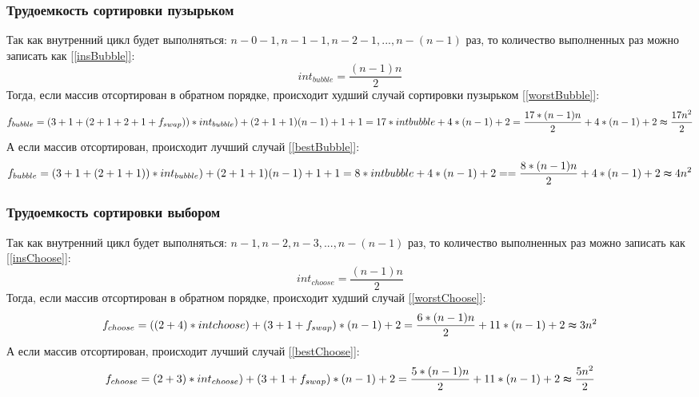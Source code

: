 \documentclass{article}
\begin{document}
		\subsubsection{Трудоемкость сортировки пузырьком}
		Так как внутренний цикл будет выполняться: $n-0-1,n-1-1,n-2-1,...,n-(n-1)$ раз, то количество выполненных раз можно записать как \hyperref[insBubble]{[\ref{insBubble}]}:
\begin{equation}\label{insBubble}
	int_{bubble}=\frac{(n-1)n}{2}
\end{equation}
	Тогда, если массив отсортирован в обратном порядке, происходит худший случай сортировки пузырьком \hyperref[worstBubble]{[\ref{worstBubble}]}:
	\begin{equation}\label{worstBubble}
		f_{bubble} = (3 + 1 + (2 + 1 + 2 + 1 + f_{swap})) * int_{bubble}) + (2 + 1 + 1)(n - 1) + 1 + 1 = 17 * int{bubble} + 4 * (n - 1) + 2 =
		\frac{17 * (n-1)n}{2} + 4 * (n - 1) + 2 \thickapprox \frac{17n^2}{2}
	\end{equation}
	А если массив отсортирован, происходит лучший случай \hyperref[bestBubble]{[\ref{bestBubble}]}:
	\begin{equation}\label{bestBubble}
		f_{bubble} = (3 + 1 + (2 + 1 + 1)) * int_{bubble}) + (2 + 1 + 1)(n - 1) + 1 + 1 = 8 * int{bubble} + 4 * (n - 1) + 2 =
		= \frac{8 * (n-1)n}{2} + 4 * (n - 1) + 2 \thickapprox 4n^2
	\end{equation}
	

	\subsubsection{Трудоемкость сортировки выбором}
		Так как внутренний цикл будет выполняться: $n-1,n-2,n-3,...,n-(n-1)$ раз, то количество выполненных раз можно записать как \hyperref[insChoose]{[\ref{insChoose}]}:\begin{equation}\label{insChoose}
	int_{choose}=\frac{(n-1)n}{2}
\end{equation}
	Тогда, если массив отсортирован в обратном порядке, происходит худший случай \hyperref[worstChoose]{[\ref{worstChoose}]}:
	\begin{equation}\label{worstChoose}
		f_{choose} = ((2 + 4) * int{choose}) + (3 + 1 + f_{swap}) * (n - 1) + 2 =
		 \frac{6 * (n-1)n}{2} + 11 * (n - 1) + 2 \thickapprox 3n^2
	\end{equation}
	А если массив отсортирован, происходит лучший случай \hyperref[bestChoose]{[\ref{bestChoose}]}:
	\begin{equation}\label{bestChoose}
		f_{choose} = (2 + 3) * int_{choose}) + (3 + 1 + f_{swap}) * (n - 1) + 2 =
		\frac{5 * (n-1)n}{2} + 11 * (n - 1) + 2 \thickapprox \frac{5n^2}{2}
	\end{equation}
\end{document}
